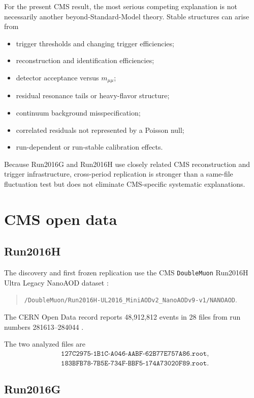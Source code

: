 \documentclass[11pt]{article}
\begin{document}
For the present CMS result, the most serious competing explanation is not
necessarily another beyond-Standard-Model theory.  Stable structures can arise
from
\begin{itemize}
    \item trigger thresholds and changing trigger efficiencies;
    \item reconstruction and identification efficiencies;
    \item detector acceptance versus \(m_{\mu\mu}\);
    \item residual resonance tails or heavy-flavor structure;
    \item continuum background misspecification;
    \item correlated residuals not represented by a Poisson null;
    \item run-dependent or run-stable calibration effects.
\end{itemize}
Because Run2016G and Run2016H use closely related CMS reconstruction and trigger
infrastructure, cross-period replication is stronger than a same-file
fluctuation test but does not eliminate CMS-specific systematic explanations.

\section{CMS open data}

\subsection{Run2016H}

The discovery and first frozen replication use the CMS
\texttt{DoubleMuon} Run2016H Ultra Legacy NanoAOD dataset
\cite{CMS2016H}:
\begin{quote}
\texttt{/DoubleMuon/Run2016H-UL2016\_MiniAODv2\_NanoAODv9-v1/NANOAOD}.
\end{quote}
The CERN Open Data record reports 48,912,812 events in 28 files from run
numbers 281613--284044 \cite{CMS2016H}.

The two analyzed files are
\begin{align}
&\texttt{127C2975-1B1C-A046-AABF-62B77E757A86.root},
\\
&\texttt{183BFB78-7B5E-734F-BBF5-174A73020F89.root}.
\end{align}

\subsection{Run2016G}
\end{document}
